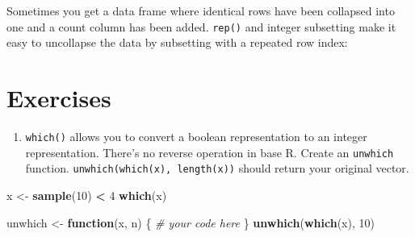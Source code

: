 \documentclass[]{book}
\newenvironment{Shaded}{\begin{snugshade}}{\end{snugshade}}
\newcommand{\KeywordTok}[1]{\textcolor[rgb]{0.13,0.29,0.53}{\textbf{#1}}}
\newcommand{\DataTypeTok}[1]{\textcolor[rgb]{0.13,0.29,0.53}{#1}}
\newcommand{\DecValTok}[1]{\textcolor[rgb]{0.00,0.00,0.81}{#1}}
\newcommand{\StringTok}[1]{\textcolor[rgb]{0.31,0.60,0.02}{#1}}
\newcommand{\CommentTok}[1]{\textcolor[rgb]{0.56,0.35,0.01}{\textit{#1}}}
\newcommand{\ControlFlowTok}[1]{\textcolor[rgb]{0.13,0.29,0.53}{\textbf{#1}}}
\newcommand{\OperatorTok}[1]{\textcolor[rgb]{0.81,0.36,0.00}{\textbf{#1}}}
\newcommand{\NormalTok}[1]{#1}
\providecommand{\tightlist}{%
  \setlength{\itemsep}{0pt}\setlength{\parskip}{0pt}}
\theoremstyle{definition}
\theoremstyle{definition}
\theoremstyle{definition}
\theoremstyle{remark}
\begin{document}
Sometimes you get a data frame where identical rows have been collapsed
into one and a count column has been added. \texttt{rep()} and integer
subsetting make it easy to uncollapse the data by subsetting with a
repeated row index:

\begin{Shaded}
\end{Shaded}

\section{Exercises}\label{exercises-2}

\begin{enumerate}
\def\labelenumi{\arabic{enumi}.}
\tightlist
\item
  \texttt{which()} allows you to convert a boolean representation to an
  integer representation. There's no reverse operation in base R. Create
  an \texttt{unwhich} function. \texttt{unwhich(which(x),\ length(x))}
  should return your original vector.
\end{enumerate}

\begin{Shaded}
\begin{Highlighting}[]
\NormalTok{x <-}\StringTok{ }\KeywordTok{sample}\NormalTok{(}\DecValTok{10}\NormalTok{) }\OperatorTok{<}\StringTok{ }\DecValTok{4}
\KeywordTok{which}\NormalTok{(x)}

\NormalTok{unwhich <-}\StringTok{ }\ControlFlowTok{function}\NormalTok{(x, n) \{}
  \CommentTok{# your code here}
\NormalTok{\}}
\KeywordTok{unwhich}\NormalTok{(}\KeywordTok{which}\NormalTok{(x), }\DecValTok{10}\NormalTok{)}
\end{Highlighting}
\end{Shaded}


\end{document}
